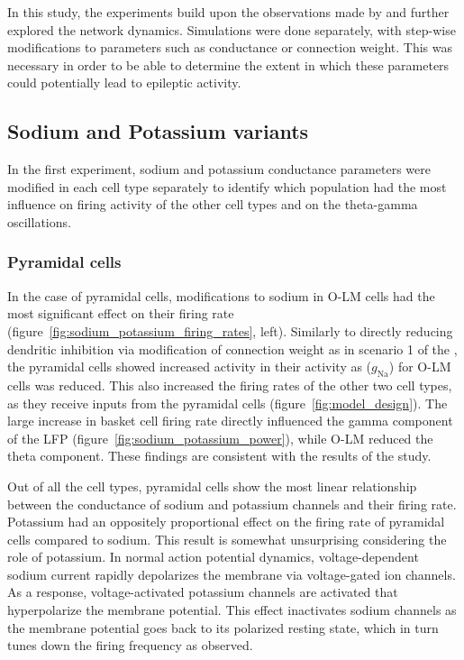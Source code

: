 In this study, the experiments build upon the observations made by \textcite{sanjayImpairedDendriticInhibition2015} and further explored the network dynamics.
Simulations were done separately, with step-wise modifications to parameters such as conductance or connection weight.
This was necessary in order to be able to determine the extent in which these parameters could potentially lead to epileptic activity.

\subsection{Sodium and Potassium variants}
In the first experiment, sodium and potassium conductance parameters were modified
in each cell type separately to identify which population had the most influence
on firing activity of the other cell types and on the theta-gamma oscillations.

\subsubsection{Pyramidal cells}
In the case of pyramidal cells, modifications to sodium in O-LM cells had the most
significant effect on their firing rate (figure~\ref{fig:sodium_potassium_firing_rates}, left). Similarly to directly
reducing dendritic inhibition via modification of connection weight as in scenario 1 of the \textcite{sanjayImpairedDendriticInhibition2015},
the pyramidal cells showed increased activity in their activity as (\(g_{\text{Na}}\)) for O-LM cells was reduced.
This also increased the firing rates of the other two cell types, as they receive inputs from the
pyramidal cells (figure~\ref{fig:model_design}). The large increase in basket cell firing rate directly influenced
the gamma component of the LFP (figure~\ref{fig:sodium_potassium_power}), while O-LM reduced the theta component.
These findings are consistent with the results of the \textcite{sanjayImpairedDendriticInhibition2015} study.

Out of all the cell types, pyramidal cells show the most linear relationship between the conductance of sodium
and potassium channels and their firing rate. Potassium had an oppositely proportional effect on the firing rate of
pyramidal cells compared to sodium. This result is somewhat unsurprising considering the role of potassium. In normal action potential
dynamics, voltage-dependent sodium current rapidly depolarizes the membrane via voltage-gated ion channels. As a response,
voltage-activated potassium channels are activated that hyperpolarize the membrane potential. This effect inactivates sodium channels
as the membrane potential goes back to its polarized resting state, which in turn tunes down the firing frequency as observed.

